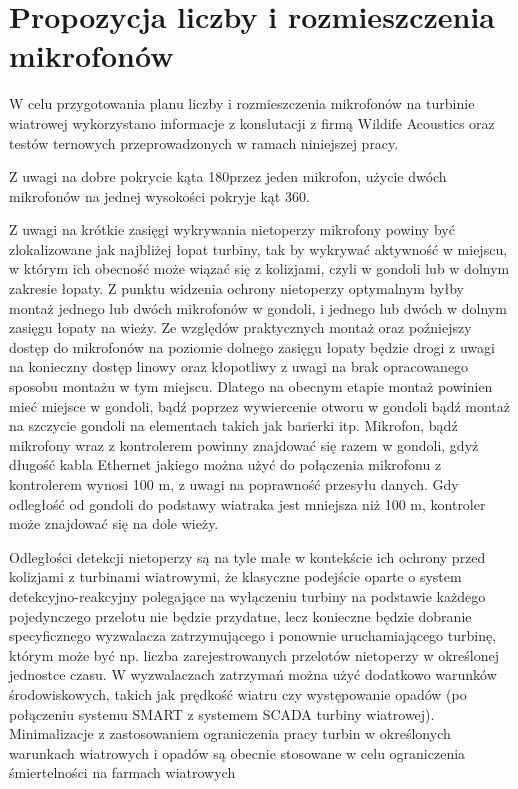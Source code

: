 \documentclass{sprz}
\begin{document}
\section{Propozycja liczby i rozmieszczenia mikrofonów}
W celu przygotowania planu liczby i rozmieszczenia mikrofonów na turbinie wiatrowej wykorzystano informacje z konslutacji z firmą Wildife Acoustics oraz testów ternowych przeprowadzonych w ramach niniejszej pracy.

Z uwagi na dobre pokrycie kąta 180\textdegree przez jeden mikrofon, użycie dwóch mikrofonów na jednej wysokości pokryje kąt 360\textdegree.

Z uwagi na krótkie zasięgi wykrywania nietoperzy mikrofony powiny być zlokalizowane jak najbliżej łopat turbiny, tak by wykrywać aktywność w miejscu, w którym ich obecność może wiązać się z kolizjami, czyli w gondoli lub w dolnym zakresie łopaty. Z punktu widzenia ochrony nietoperzy optymalnym byłby montaż jednego lub dwóch mikrofonów w gondoli, i jednego lub dwóch w dolnym zasięgu łopaty na wieży. Ze względów praktycznych montaż oraz poźniejszy dostęp do mikrofonów na poziomie dolnego zasięgu łopaty będzie drogi z uwagi na konieczny dostęp linowy oraz kłopotliwy z uwagi na brak opracowanego sposobu montażu w tym miejscu. Dlatego na obecnym etapie montaż powinien mieć miejsce w gondoli, bądź poprzez wywiercenie otworu w gondoli bądź montaż na szczycie gondoli na elementach takich jak barierki itp.
Mikrofon, bądź mikrofony wraz z kontrolerem powinny znajdować się razem w gondoli, gdyż długość kabla Ethernet jakiego można użyć do połączenia mikrofonu z kontrolerem wynosi 100 m, z uwagi na poprawność przesyłu danych. Gdy odległość od gondoli do podstawy wiatraka jest mniejsza niż 100 m, kontroler może znajdować się na dole wieży.

Odległości detekcji nietoperzy są na tyle małe w kontekście ich ochrony przed kolizjami z turbinami wiatrowymi, że klasyczne podejście oparte o system detekcyjno-reakcyjny polegające na wyłączeniu turbiny na podstawie każdego pojedynczego przelotu nie będzie przydatne, lecz konieczne będzie dobranie specyficznego wyzwalacza zatrzymującego i ponownie uruchamiającego turbinę, którym może być np. liczba zarejestrowanych przelotów nietoperzy w określonej jednostce czasu. W wyzwalaczach zatrzymań można użyć dodatkowo warunków środowiskowych, takich jak prędkość wiatru czy występowanie opadów (po połączeniu systemu SMART z systemem SCADA turbiny wiatrowej). Minimalizacje z zastosowaniem ograniczenia pracy turbin w określonych warunkach wiatrowych i opadów są obecnie stosowane w celu ograniczenia śmiertelności na farmach wiatrowych \cite{Wytyczne}
\end{document}
